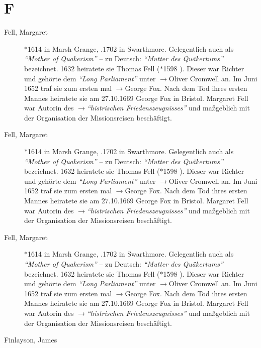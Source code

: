 \section*{F}

\articlesize

\begin{description}


 \item[Fell, Margaret] $\ast$1614 in Marsh Grange, .1702 in Swarthmore. Gelegentlich auch als \textit{"`Mother of Quakerism"'} -- zu Deutsch: \textit{"`Mutter des Quäkertums"'} bezeichnet. 1632 heiratete sie Thomas Fell ($\ast$1598 ). Dieser war Richter und gehörte dem \textit{"`Long Parliament"'} unter $\to$Oliver Cromwell an. Im Juni 1652 traf sie zum ersten mal $\to$George Fox. Nach dem Tod ihres ersten Mannes heiratete sie am 27.10.1669 George Fox in Bristol. Margaret Fell war Autorin des $\to$\textit{"`histrischen Friedenszeugnisses"'} und maßgeblich mit der Organisation der Missionsreisen beschäftigt.


 \item[Fell, Margaret] $\ast$1614 in Marsh Grange, .1702 in Swarthmore. Gelegentlich auch als \textit{"`Mother of Quakerism"'} -- zu Deutsch: \textit{"`Mutter des Quäkertums"'} bezeichnet. 1632 heiratete sie Thomas Fell ($\ast$1598 ). Dieser war Richter und gehörte dem \textit{"`Long Parliament"'} unter $\to$Oliver Cromwell an. Im Juni 1652 traf sie zum ersten mal $\to$George Fox. Nach dem Tod ihres ersten Mannes heiratete sie am 27.10.1669 George Fox in Bristol. Margaret Fell war Autorin des $\to$\textit{"`histrischen Friedenszeugnisses"'} und maßgeblich mit der Organisation der Missionsreisen beschäftigt.


 \item[Fell, Margaret] $\ast$1614 in Marsh Grange, .1702 in Swarthmore. Gelegentlich auch als \textit{"`Mother of Quakerism"'} -- zu Deutsch: \textit{"`Mutter des Quäkertums"'} bezeichnet. 1632 heiratete sie Thomas Fell ($\ast$1598 ). Dieser war Richter und gehörte dem \textit{"`Long Parliament"'} unter $\to$Oliver Cromwell an. Im Juni 1652 traf sie zum ersten mal $\to$George Fox. Nach dem Tod ihres ersten Mannes heiratete sie am 27.10.1669 George Fox in Bristol. Margaret Fell war Autorin des $\to$\textit{"`histrischen Friedenszeugnisses"'} und maßgeblich mit der Organisation der Missionsreisen beschäftigt.

 \item[Finlayson, James]


\end{description}
